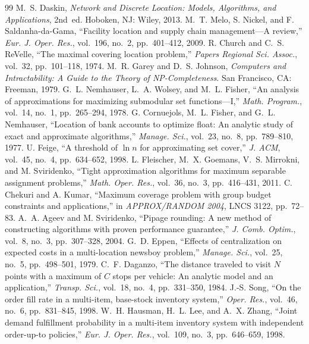 \documentclass[10pt,twocolumn,letterpaper]{article}
\theoremstyle{definition}
\begin{document}
\begin{thebibliography}{99}
 M.~S. Daskin, \emph{Network and Discrete Location: Models, Algorithms, and Applications}, 2nd~ed. Hoboken, NJ: Wiley, 2013.
 M.~T. Melo, S. Nickel, and F. Saldanha-da-Gama, ``Facility location and supply chain management---A review,'' \emph{Eur. J. Oper. Res.}, vol.~196, no.~2, pp.~401--412, 2009.
 R. Church and C.~S. ReVelle, ``The maximal covering location problem,'' \emph{Papers Regional Sci. Assoc.}, vol.~32, pp.~101--118, 1974.
 M.~R. Garey and D.~S. Johnson, \emph{Computers and Intractability: A Guide to the Theory of NP-Completeness}. San Francisco, CA: Freeman, 1979.
 G.~L. Nemhauser, L.~A. Wolsey, and M.~L. Fisher, ``An analysis of approximations for maximizing submodular set functions---I,'' \emph{Math. Program.}, vol.~14, no.~1, pp.~265--294, 1978.
 G. Cornuejols, M.~L. Fisher, and G.~L. Nemhauser, ``Location of bank accounts to optimize float: An analytic study of exact and approximate algorithms,'' \emph{Manage. Sci.}, vol.~23, no.~8, pp.~789--810, 1977.
 U. Feige, ``A threshold of $\ln n$ for approximating set cover,'' \emph{J. ACM}, vol.~45, no.~4, pp.~634--652, 1998.
 L. Fleischer, M.~X. Goemans, V.~S. Mirrokni, and M. Sviridenko, ``Tight approximation algorithms for maximum separable assignment problems,'' \emph{Math. Oper. Res.}, vol.~36, no.~3, pp.~416--431, 2011.
 C. Chekuri and A. Kumar, ``Maximum coverage problem with group budget constraints and applications,'' in \emph{APPROX/RANDOM 2004}, LNCS 3122, pp.~72--83.
 A.~A. Ageev and M. Sviridenko, ``Pipage rounding: A new method of constructing algorithms with proven performance guarantee,'' \emph{J. Comb. Optim.}, vol.~8, no.~3, pp.~307--328, 2004.
 G.~D. Eppen, ``Effects of centralization on expected costs in a multi-location newsboy problem,'' \emph{Manage. Sci.}, vol.~25, no.~5, pp.~498--501, 1979.
 C.~F. Daganzo, ``The distance traveled to visit $N$ points with a maximum of $C$ stops per vehicle: An analytic model and an application,'' \emph{Transp. Sci.}, vol.~18, no.~4, pp.~331--350, 1984.
 J.-S. Song, ``On the order fill rate in a multi-item, base-stock inventory system,'' \emph{Oper. Res.}, vol.~46, no.~6, pp.~831--845, 1998.
 W.~H. Hausman, H.~L. Lee, and A.~X. Zhang, ``Joint demand fulfillment probability in a multi-item inventory system with independent order-up-to policies,'' \emph{Eur. J. Oper. Res.}, vol.~109, no.~3, pp.~646--659, 1998.

\end{thebibliography}
\end{document}
